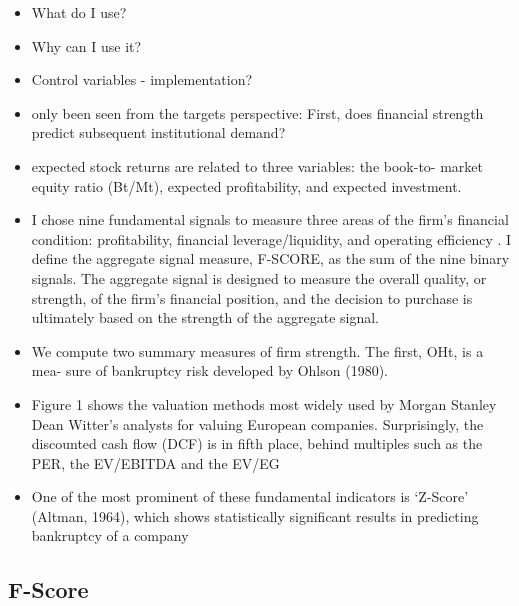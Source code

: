 \documentclass[12pt]{article}
\begin{document}
    \begin{itemize}
        \item What do I use? 
        \item Why can I use it?
        \item Control variables - implementation?

        \item only been seen from the targets perspective: First, does financial strength predict subsequent institutional demand? \citep{Choi2012}

        \item expected stock returns are related to three variables: the book-to-
        market equity ratio (Bt/Mt), expected profitability, and expected investment.\citep{Fama2006}
        
        \item I chose nine fundamental signals to measure three areas of the firm's financial condition: profitability, financial leverage/liquidity, and operating efficiency \citep{Piotroski2000}. I define the aggregate signal measure, F-SCORE, as the sum of the nine binary signals. The aggregate signal is designed to measure the overall quality, or strength, of the firm's financial position, and the decision to purchase is ultimately based on the strength of the aggregate signal.

        \item We compute two summary measures of firm strength. The first, OHt, is a mea- sure of bankruptcy risk developed by Ohlson (1980).\citep{Fama2006}

        \item Figure 1 shows the valuation methods most widely used by Morgan Stanley Dean Witter’s analysts for valuing European companies. Surprisingly, the discounted cash flow (DCF) is in fifth place, behind multiples such as the PER, the EV/EBITDA and the EV/EG \citep{Fernandez2001}

        \item One of the most prominent of these fundamental indicators is ‘Z-Score’ (Altman, 1964), which shows statistically significant results in predicting bankruptcy of a company \citep{Mohr2012}

    \end{itemize}

\subsection{F-Score}
\end{document}
